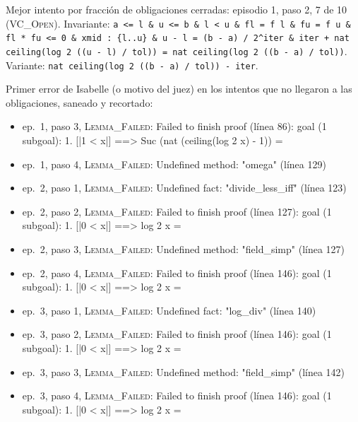 \documentclass[11pt,a4paper]{article}
\begin{document}
{\raggedright Mejor intento por fracción de obligaciones cerradas: episodio 1, paso 2, 7 de 10 (\textsc{VC\_Open}). Invariante: \texttt{a <=\allowbreak{} l \&\allowbreak{} u <=\allowbreak{} b \&\allowbreak{} l < u \&\allowbreak{} fl =\allowbreak{} f l \&\allowbreak{} fu =\allowbreak{} f u \&\allowbreak{} fl *\allowbreak{} fu <=\allowbreak{} 0 \&\allowbreak{} xmid :\allowbreak{} \{l..u\} \&\allowbreak{} u -\allowbreak{} l =\allowbreak{} (\allowbreak{}b -\allowbreak{} a) /\allowbreak{} 2\textasciicircum{}iter \&\allowbreak{} iter +\allowbreak{} nat ceiling(\allowbreak{}log 2 (\allowbreak{}(\allowbreak{}u -\allowbreak{} l) /\allowbreak{} tol)) =\allowbreak{} nat ceiling(\allowbreak{}log 2 (\allowbreak{}(\allowbreak{}b -\allowbreak{} a) /\allowbreak{} tol))}. Variante: \texttt{nat ceiling(\allowbreak{}log 2 (\allowbreak{}(\allowbreak{}b -\allowbreak{} a) /\allowbreak{} tol)) -\allowbreak{} iter}.\par}

Primer error de Isabelle (o motivo del juez) en los intentos que no llegaron a las obligaciones, saneado y recortado:

\begin{itemize}
  \item ep.~1, paso 3, \textsc{Lemma\_Failed}: Failed to finish proof (línea 86): goal (1 subgoal): 1. [|1 < x|] ==> Suc (nat (ceiling(log 2 x) - 1)) =
  \item ep.~1, paso 4, \textsc{Lemma\_Failed}: Undefined method: "omega" (línea 129)
  \item ep.~2, paso 1, \textsc{Lemma\_Failed}: Undefined fact: "divide\_less\_iff" (línea 123)
  \item ep.~2, paso 2, \textsc{Lemma\_Failed}: Failed to finish proof (línea 127): goal (1 subgoal): 1. [|0 < x|] ==> log 2 x =
  \item ep.~2, paso 3, \textsc{Lemma\_Failed}: Undefined method: "field\_simp" (línea 127)
  \item ep.~2, paso 4, \textsc{Lemma\_Failed}: Failed to finish proof (línea 146): goal (1 subgoal): 1. [|0 < x|] ==> log 2 x =
  \item ep.~3, paso 1, \textsc{Lemma\_Failed}: Undefined fact: "log\_div" (línea 140)
  \item ep.~3, paso 2, \textsc{Lemma\_Failed}: Failed to finish proof (línea 146): goal (1 subgoal): 1. [|0 < x|] ==> log 2 x =
  \item ep.~3, paso 3, \textsc{Lemma\_Failed}: Undefined method: "field\_simp" (línea 142)
  \item ep.~3, paso 4, \textsc{Lemma\_Failed}: Failed to finish proof (línea 146): goal (1 subgoal): 1. [|0 < x|] ==> log 2 x =
\end{itemize}
\end{document}
